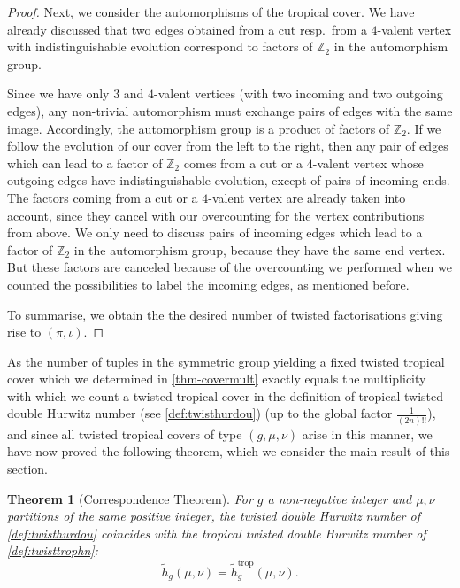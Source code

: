 \documentclass[11pt]{article}
\newtheorem{theo}{Theorem}[section]
\theoremstyle{definition}
\numberwithin{equation}{section}
\DeclareMathOperator{\trop}{trop}
\begin{document}
\begin{proof}
Next, we consider the automorphisms of the tropical cover. We have already discussed that two edges obtained from a cut resp.\ from a $4$-valent vertex with indistinguishable evolution correspond to factors of $\mathbb{Z}_2$ in the  automorphism  group. 

Since we have only $3$ and $4$-valent vertices (with two incoming and two outgoing edges), any non-trivial automorphism  must exchange pairs of edges with the same image. Accordingly, the automorphism group is a product of factors of $\mathbb{Z}_2$. If we follow the evolution of our cover from the left to the right, then any pair of edges which can lead to a factor of $\mathbb{Z}_2$ comes from a cut or a $4$-valent vertex whose outgoing edges have indistinguishable evolution, except of pairs of incoming ends. The  factors coming from a cut or a $4$-valent vertex are already taken into account, since they cancel with our overcounting for the vertex contributions from above. We only need to discuss pairs of incoming edges which lead to a factor of $\mathbb{Z}_2$ in the automorphism group, because they have the same end vertex.
But these factors are canceled because of the overcounting we performed when we counted the possibilities to label the incoming edges, as mentioned before.

To summarise, we obtain the the desired number of twisted factorisations giving rise to $(\pi,\iota)$.
\end{proof}

As the number of tuples in the symmetric group yielding a fixed twisted tropical cover which we determined in \cref{thm-covermult} exactly equals the multiplicity with which we count a twisted tropical cover in the definition of tropical twisted double Hurwitz number (see \cref{def:twisthurdou}) (up to the global factor $\frac{1}{(2n)!!}$), and since all twisted tropical covers of type $(g,\mu,\nu)$ arise in this manner, we have now proved the following theorem, which we consider the main result of this section.

\begin{theo}[Correspondence Theorem]
\label{thm-corres}
For $g$ a non-negative integer and $\mu,\nu$ partitions of the same positive integer, the twisted double Hurwitz number of \cref{def:twisthurdou} coincides with the tropical twisted double Hurwitz number of \cref{def:twisttrophn}:
$$\tilde{h}_g(\mu,\nu)=\tilde{h}^{\trop}_g(\mu,\nu).$$
\end{theo}
\end{document}
